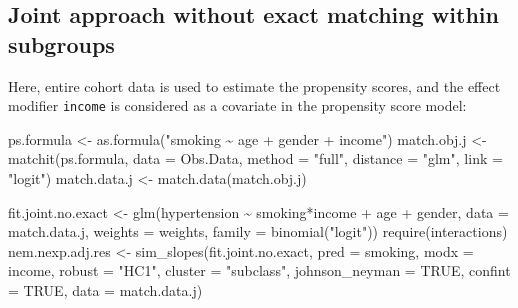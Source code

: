 \documentclass[
  letterpaper,
  DIV=11,
  numbers=noendperiod]{scrreprt}
\newenvironment{Shaded}{\begin{snugshade}}{\end{snugshade}}
\newcommand{\AttributeTok}[1]{\textcolor[rgb]{0.40,0.45,0.13}{#1}}
\newcommand{\ConstantTok}[1]{\textcolor[rgb]{0.56,0.35,0.01}{#1}}
\newcommand{\FunctionTok}[1]{\textcolor[rgb]{0.28,0.35,0.67}{#1}}
\newcommand{\NormalTok}[1]{\textcolor[rgb]{0.00,0.23,0.31}{#1}}
\newcommand{\OtherTok}[1]{\textcolor[rgb]{0.00,0.23,0.31}{#1}}
\newcommand{\SpecialCharTok}[1]{\textcolor[rgb]{0.37,0.37,0.37}{#1}}
\newcommand{\StringTok}[1]{\textcolor[rgb]{0.13,0.47,0.30}{#1}}
\begin{document}
\hypertarget{joint-approach-without-exact-matching-within-subgroups}{%
\subsection{Joint approach without exact matching within
subgroups}\label{joint-approach-without-exact-matching-within-subgroups}}

Here, entire cohort data is used to estimate the propensity scores, and
the effect modifier \texttt{income} is considered as a covariate in the
propensity score model:

\begin{Shaded}
\begin{Highlighting}[]
\NormalTok{ps.formula }\OtherTok{\textless{}{-}} \FunctionTok{as.formula}\NormalTok{(}\StringTok{"smoking \textasciitilde{} age + gender + income"}\NormalTok{)}
\NormalTok{match.obj.j }\OtherTok{\textless{}{-}} \FunctionTok{matchit}\NormalTok{(ps.formula, }\AttributeTok{data =}\NormalTok{ Obs.Data,}
                      \AttributeTok{method =} \StringTok{"full"}\NormalTok{, }
                      \AttributeTok{distance =} \StringTok{"glm"}\NormalTok{,}
                      \AttributeTok{link =} \StringTok{"logit"}\NormalTok{)}
\NormalTok{match.data.j }\OtherTok{\textless{}{-}} \FunctionTok{match.data}\NormalTok{(match.obj.j)}
\end{Highlighting}
\end{Shaded}

\begin{Shaded}
\begin{Highlighting}[]
\NormalTok{fit.joint.no.exact }\OtherTok{\textless{}{-}} \FunctionTok{glm}\NormalTok{(hypertension }\SpecialCharTok{\textasciitilde{}}\NormalTok{ smoking}\SpecialCharTok{*}\NormalTok{income }\SpecialCharTok{+}\NormalTok{ age }\SpecialCharTok{+}\NormalTok{ gender, }
                          \AttributeTok{data =}\NormalTok{ match.data.j, }
                          \AttributeTok{weights =}\NormalTok{ weights,}
                          \AttributeTok{family =} \FunctionTok{binomial}\NormalTok{(}\StringTok{"logit"}\NormalTok{))}
\FunctionTok{require}\NormalTok{(interactions)}
\NormalTok{nem.nexp.adj.res }\OtherTok{\textless{}{-}} \FunctionTok{sim\_slopes}\NormalTok{(fit.joint.no.exact, }
                               \AttributeTok{pred =}\NormalTok{ smoking, }
                               \AttributeTok{modx =}\NormalTok{ income,}
                               \AttributeTok{robust =} \StringTok{"HC1"}\NormalTok{, }
                               \AttributeTok{cluster =} \StringTok{"subclass"}\NormalTok{,}
                               \AttributeTok{johnson\_neyman =} \ConstantTok{TRUE}\NormalTok{, }
                               \AttributeTok{confint =} \ConstantTok{TRUE}\NormalTok{,}
                               \AttributeTok{data =}\NormalTok{ match.data.j)}
\end{Highlighting}
\end{Shaded}
\end{document}
